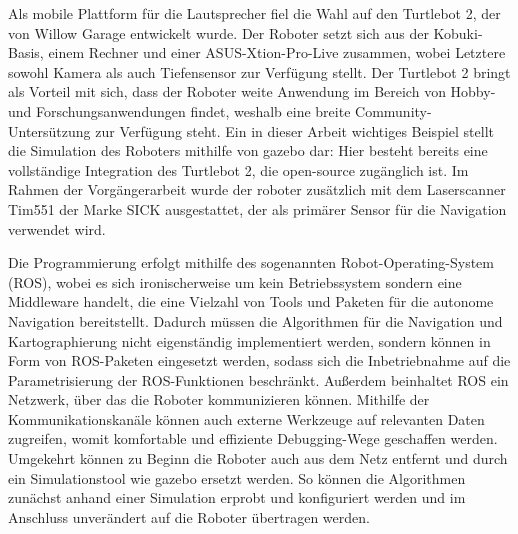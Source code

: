 Als mobile Plattform für die Lautsprecher fiel die Wahl auf den Turtlebot 2, der von Willow Garage entwickelt wurde. Der Roboter setzt sich aus der Kobuki-Basis, einem Rechner und einer ASUS-Xtion-Pro-Live zusammen, wobei Letztere sowohl Kamera als auch Tiefensensor zur Verfügung stellt. Der Turtlebot 2 bringt als Vorteil mit sich, dass der Roboter weite Anwendung im Bereich von Hobby- und Forschungsanwendungen findet, weshalb eine breite Community-Untersützung zur Verfügung steht. Ein in dieser Arbeit wichtiges Beispiel stellt die Simulation des Roboters mithilfe von gazebo dar: Hier besteht bereits eine vollständige Integration des Turtlebot 2, die open-source zugänglich ist. Im Rahmen der Vorgängerarbeit wurde der roboter zusätzlich mit dem Laserscanner Tim551 der Marke SICK ausgestattet, der als primärer Sensor für die Navigation verwendet wird.

Die Programmierung erfolgt mithilfe des sogenannten Robot-Operating-System (ROS), wobei es sich ironischerweise um kein Betriebssystem sondern eine Middleware handelt, die eine Vielzahl von Tools und Paketen für die autonome Navigation bereitstellt. Dadurch müssen die Algorithmen für die Navigation und Kartographierung nicht eigenständig implementiert werden, sondern können in Form von ROS-Paketen eingesetzt werden, sodass sich die Inbetriebnahme auf die Parametrisierung der ROS-Funktionen beschränkt. Außerdem beinhaltet ROS ein Netzwerk, über das die Roboter kommunizieren können. Mithilfe der Kommunikationskanäle können auch externe Werkzeuge auf relevanten Daten zugreifen, womit komfortable und effiziente Debugging-Wege geschaffen werden. Umgekehrt können zu Beginn die Roboter auch aus dem Netz entfernt und durch ein Simulationstool wie gazebo ersetzt werden. So können die Algorithmen zunächst anhand einer Simulation erprobt und konfiguriert werden und im Anschluss unverändert auf die Roboter übertragen werden.

